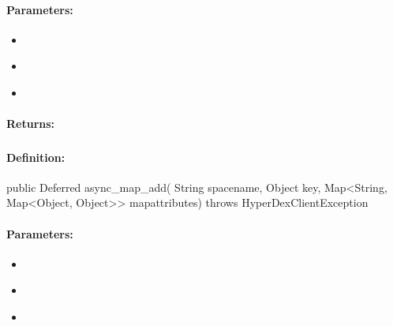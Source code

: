 \paragraph{Parameters:}
\begin{itemize}[noitemsep]
\item {}\\

\item {}\\

\item {}\\

\end{itemize}

\paragraph{Returns:}


\pagebreak
\subsubsection{}
\label{api:java:async_map_add}


\paragraph{Definition:}
\begin{javacode}
public Deferred async_map_add(
        String spacename,
        Object key,
        Map<String, Map<Object, Object>> mapattributes) throws HyperDexClientException
\end{javacode}

\paragraph{Parameters:}
\begin{itemize}[noitemsep]
\item {}\\

\item {}\\

\item {}\\

\end{itemize}

